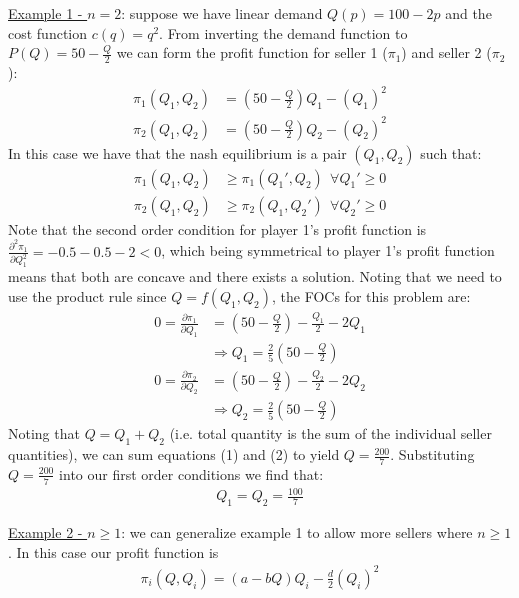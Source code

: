 \documentclass{article}
\begin{document}
  \underline{Example 1 - $n = 2$}: suppose we have linear demand $Q(p) = 100 - 2p$ and the cost function $c(q) = q^{2}$. From inverting the demand function to $P(Q) = 50 - \tfrac{Q}{2}$ we can form the profit function for seller 1 ($\pi_{1}$) and seller 2 ($\pi_{2}$):
  \begin{align*}
    \pi_{1}(Q_{1}, Q_{2}) &= (50 - \frac{Q}{2})Q_{1} - (Q_{1})^{2} \\
    \pi_{2}(Q_{1}, Q_{2}) &= (50 - \frac{Q}{2})Q_{2} - (Q_{2})^{2}
  \end{align*}
  In this case we have that the nash equilibrium is a pair $(Q_{1}, Q_{2})$ such that:
  \begin{align*}
    \pi_{1}(Q_{1}, Q_{2}) &\geq \pi_{1}(Q_{1}', Q_{2}) \ \ \forall Q_{1}' \geq 0 \\
    \pi_{2}(Q_{1},Q_{2}) &\geq \pi_{2}(Q_{1}, Q_{2}') \ \ \forall Q_{2}' \geq 0
  \end{align*}
  Note that the second order condition for player 1's profit function is $\tfrac{\partial^{2} \pi_{1}}{\partial Q_{1}^{2}} = -0.5 -0.5 -2 < 0$, which being symmetrical to player 1's profit function means that both are concave and there exists a solution. Noting that we need to use the product rule since $Q = f(Q_{1}, Q_{2})$, the FOCs for this problem are:
  \begin{align*}
    0 = \frac{\partial \pi_{1}}{\partial Q_{1}} &= (50 - \frac{Q}{2}) - \frac{Q_{1}}{2} - 2Q_{1} \\
    &\Rightarrow Q_{1} = \frac{2}{5} (50 - \frac{Q}{2}) \ \tag{1} \\
    0 = \frac{\partial \pi_{2}}{\partial Q_{2}} &= (50 - \frac{Q}{2}) - \frac{Q_{2}}{2} - 2Q_{2} \\
    &\Rightarrow Q_{2} = \frac{2}{5}(50 - \frac{Q}{2}) \ \tag{2}
  \end{align*}
  Noting that $Q = Q_{1} + Q_{2}$ (i.e. total quantity is the sum of the individual seller quantities), we can sum equations (1) and (2) to yield $Q = \tfrac{200}{7}$. Substituting $Q = \tfrac{200}{7}$ into our first order conditions we find that:
  \begin{gather*}
    Q_{1} = Q_{2} = \frac{100}{7}
  \end{gather*}
  \par
  \underline{Example 2 - $n \geq 1$}: we can generalize example 1 to allow more sellers where $n \geq 1$. In this case our profit function is
  \begin{gather*}
    \pi_{i}(Q, Q_{i}) = (a - bQ)Q_{i} - \frac{d}{2}(Q_{i})^{2}
  \end{gather*}
\end{document}
